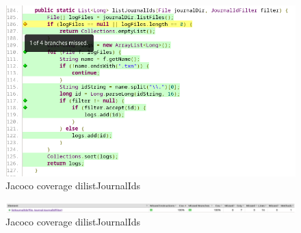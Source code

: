 \documentclass[12pt, a4paper]{article}
\begin{document}
  \begin{figure}
    \includegraphics[width=\linewidth]{MissedBranchListJournalIds.png}
    \caption{Jacoco coverage dilistJournalIds}
    \label{fig:listJournalIdsCFG}
  \end{figure}

  \begin{figure}
    \includegraphics[width=\linewidth]{JacocoCoveragelistJournalIds2.png}
    \caption{Jacoco coverage dilistJournalIds}
    \label{fig:listJournalIdsCFG}

  \end{figure}
\end{document}
